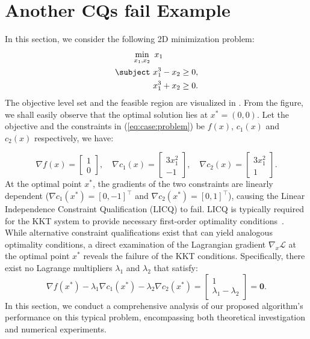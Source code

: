 \section{Another CQs fail Example}
\label{app:toy-cq-fail}
In this section, we consider the following 2D minimization problem:
\begin{align}
    \label{eq:case:problem}
    \min_{x_1,x_2} & \displaystyle \,\,\,x_1 \notag\\
    \subject &\,\, x^3_1-x_2 \geq 0,\\
    & \,\, x^3_1+x_2 \geq 0.\notag
\end{align}
The objective level set and the feasible region are visualized in . From the figure, we shall easily observe that the optimal solution lies at $x^*=(0,0)$. Let the objective and the constraints in (\ref{eq:case:problem}) be $f(x)$, $c_1(x)$ and $c_2(x)$ respectively, we have:

\begin{equation}
\nabla f\left(x\right)=\left[\begin{array}{l}
1 \\
0
\end{array}\right], \quad \nabla c_1\left(x\right)=\left[\begin{array}{c}
3x_1^2\\
-1
\end{array}\right], \quad \nabla c_2\left(x\right)=\left[\begin{array}{c}
3x_1^2 \\
1
\end{array}\right].
\end{equation}
At the optimal point $x^*$, the gradients of the two constraints are linearly dependent ($\nabla c_1(x^*)=[0,-1]^{\top}$ and $\nabla c_2(x^*)=[0,1]^{\top}$), causing the Linear Independence Constraint Qualification (LICQ) to fail. LICQ is typically required for the KKT system to provide necessary first-order optimality conditions~\cite{nocedal1999springer-numerical-optimization}. While alternative constraint qualifications exist that can yield analogous optimality conditions, a direct examination of the Lagrangian gradient $\nabla_x \mathcal{L}$ at the optimal point $x^*$ reveals the failure of the KKT conditions. Specifically, there exist no Lagrange multipliers $\lambda_1$ and $\lambda_2$ that satisfy:
\begin{equation}
    \nabla f(x^*) - \lambda_1 \nabla c_1(x^*) -\lambda_2 \nabla c_2(x^*) = \left[\begin{array}{c}
         1 \\
         \lambda_1 -\lambda_2 
    \end{array}\right] = \mathbf{0}.
\end{equation}
In this section, we conduct a comprehensive analysis of our proposed algorithm's performance on this typical problem, encompassing both theoretical investigation and numerical experiments.

